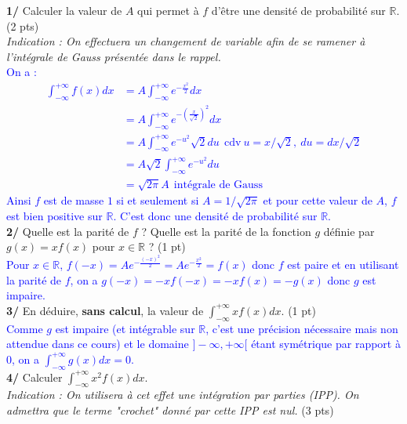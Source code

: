 \documentclass[a4paper,12pt]{article}
\begin{document}
\textbf{1/} Calculer la valeur de $A$ qui permet à $f$ d'être une densité de probabilité sur $\mathbb{R}$. (2 pts)\\
\textit{Indication : On effectuera un changement de variable afin de se ramener à l'intégrale de Gauss présentée dans le rappel.} \\

\textcolor{blue}{
On a :
\begin{align*}
\int_{-\infty}^{+\infty} f(x) dx &= A \int_{-\infty}^{+\infty} e^{-\frac{x^2}{2}} dx \\
&= A \int_{-\infty}^{+\infty} e^{-\left( \frac{x}{\sqrt{2}} \right)^2 } dx \\
&= A \int_{-\infty}^{+\infty} e^{- u^2} \sqrt{2} du \ \ \text{cdv} \ u= x/ \sqrt{2}, \ du = dx/\sqrt{2} \\
&= A \sqrt{2} \int_{-\infty}^{+\infty} e^{-u^2} du \\
& = \sqrt{2 \pi} A \ \ \text{intégrale de Gauss}
\end{align*}
Ainsi $f$ est de masse $1$ si et seulement si $\boxed{A=1/\sqrt{2\pi}}$ et pour cette valeur de $A$, $f$ est bien positive sur $\mathbb{R}$. C'est donc une densité de probabilité sur $\mathbb{R}$.} \\

\textbf{2/} Quelle est la parité de $f$ ? Quelle est la parité de la fonction $g$ définie par $g(x)=xf(x)$ pour $x \in \mathbb{R}$ ? (1 pt) \\

\textcolor{blue}{
Pour $x \in \mathbb{R}$, $f(-x)=Ae^{- \frac{(-x)^2}{2}} = Ae^{- \frac{x^2}{2}} =f(x) $ donc $f$ est paire et en utilisant la parité de $f$, on a $g(-x)=-xf(-x)=-xf(x)=-g(x)$ donc $g$ est impaire.} \\

\textbf{3/} En déduire, \textbf{sans calcul}, la valeur de $\int_{-\infty}^{+ \infty} x f(x) dx$. (1 pt) \\

\textcolor{blue}{
Comme $g$ est impaire (et intégrable sur $\mathbb{R}$, c'est une précision nécessaire mais non attendue dans ce cours) et le domaine $]- \infty, + \infty[$ étant symétrique par rapport à $0$, on a $\boxed{\int_{-\infty}^{+ \infty} g(x) dx = 0}$. } \\

\textbf{4/} Calculer $\int_{-\infty}^{+ \infty} x^2 f(x) dx$. \\
\textit{Indication : On utilisera à cet effet une intégration par parties (IPP). On admettra que le terme "crochet" donné par cette IPP est nul.} (3 pts) \\
\end{document}
